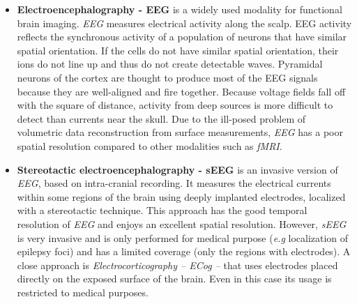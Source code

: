 \begin{itemize}
\item{\bf {Electroencephalography - EEG}}
is a widely used modality for functional brain
imaging. \emph{EEG} measures electrical activity along the scalp. EEG activity  reflects the synchronous activity of a population of neurons that have similar spatial orientation. If the cells do not have similar spatial orientation, their ions do not line up and thus do not create detectable waves. Pyramidal neurons of the cortex are thought to produce most of the EEG signals because they are well-aligned and fire together. Because voltage fields fall off with the square of distance, activity from deep sources is more difficult to detect than currents near the skull. Due to the ill-posed problem of
volumetric data reconstruction from surface measurements,
\emph{EEG} has a poor spatial resolution compared to other modalities
such as \emph{fMRI}.

\item{\bf {Stereotactic electroencephalography - sEEG}} is an invasive version of
\emph{EEG}, based on intra-cranial recording. It measures the electrical
currents
within some regions of the brain using deeply implanted electrodes, localized
with a stereotactic technique.
This approach has the good temporal resolution of \emph{EEG} and enjoys an
excellent spatial resolution. However, \emph{sEEG}
is very invasive and is only performed for medical purpose (\emph{e.g}
localization of epilepsy foci) and has a limited coverage (only the regions with electrodes).
A close approach is \emph{Electrocorticography -- ECog --} that uses
electrodes placed directly on the exposed surface of the brain. Even in this case its usage is restricted to medical purposes.



\end{itemize}
